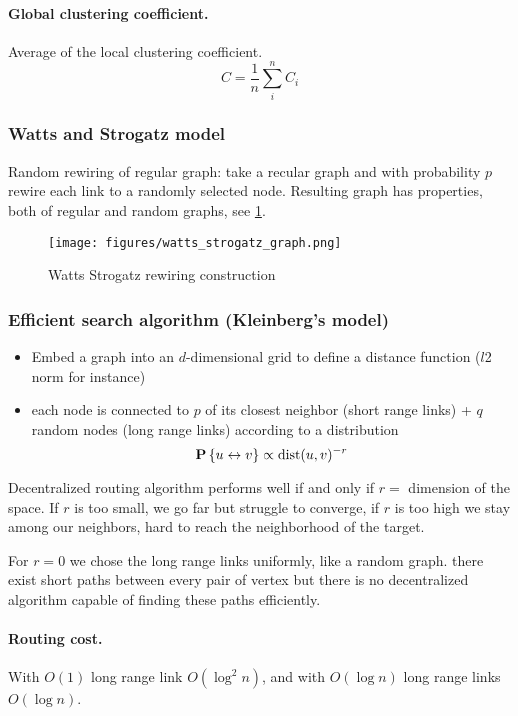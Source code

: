\paragraph{Global clustering coefficient.}
  Average of the local clustering coefficient.
  \[
    C = \frac 1 n \sum_i^n C_i
  \]

\subsubsection{Watts and Strogatz model}

Random rewiring of regular graph: take a recular graph and with probability $p$ rewire each link to a randomly selected node. Resulting graph has properties, both of regular and random graphs, see \cref{fig:watts_strogatz}.

\begin{figure}
  \centering
  \texttt{[image: figures/watts\_strogatz\_graph.png]}
  \caption{Watts Strogatz rewiring construction}
  \label{fig:watts_strogatz}
\end{figure}

\subsubsection{Efficient search algorithm (Kleinberg’s model)}

\begin{itemize}
  \item Embed a graph into an $d$-dimensional grid to define a distance function ($l$2 norm for instance)
  \item each node is connected to $p$ of its closest neighbor (short range links) + $q$ random nodes (long range links) according to a distribution
  \[
    \P{u \leftrightarrow v} \propto \text{dist}(u,v)^{-r}
  \]
\end{itemize}

Decentralized routing algorithm performs well if and only if $r=$ dimension of the space. If $r$ is too small, we go far but struggle to converge, if $r$ is too high we stay among our neighbors, hard to reach the neighborhood of the target.

For $r=0$ we chose the long range links uniformly, like a random graph. there exist short paths between every pair of vertex but there is no decentralized algorithm capable of finding these paths efficiently.

\paragraph{Routing cost.} With $O(1)$ long range link $O(\log^2 n)$, and with $O(\log n)$ long range links $O(\log n)$.
